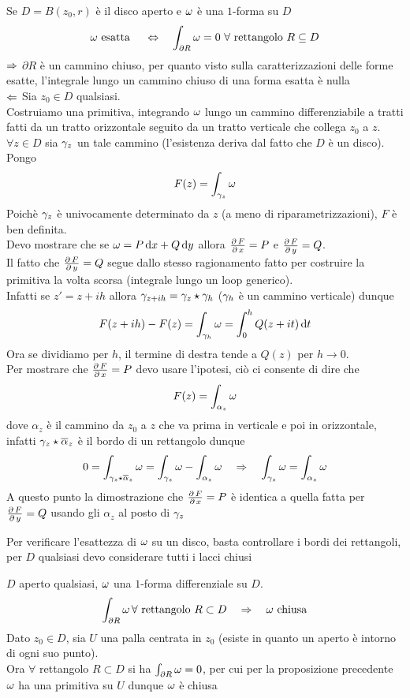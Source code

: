 \begin{prop}Se $D=B(z_0,r)$ \`e il disco aperto e $\omega$ \`e una $1$-forma su $D$
$$\omega \text{ esatta } \quad \Leftrightarrow \quad  \int_{\partial R} \omega = 0 \,\, \forall \text{ rettangolo } R \subseteq D $$
\proof $\Rightarrow$ $\partial R $ \`e un cammino chiuso, per quanto visto sulla caratterizzazioni delle forme esatte, l'integrale lungo un cammino chiuso di una forma esatta \`e nulla\\
$\Leftarrow$ Sia $z_0\in D$ qualsiasi.\\
 Costruiamo una primitiva, integrando $\omega$ lungo un cammino differenziabile a tratti fatti da un tratto orizzontale seguito da un tratto verticale che collega $z_0$ a $z$.\\
$\forall z\in D$ sia $\gamma_z$ un tale cammino (l'esistenza deriva dal fatto che $D$ \`e un disco). Pongo 
$$F(z) =\int_{\gamma_z} \omega$$
Poich\`e $\gamma_z$ \`e univocamente determinato da $z$  (a meno di riparametrizzazioni), $F$ \`e ben definita.\\
Devo mostrare che se $\omega=P\, \mathrm{d} x + Q\, \mathrm{d} y $ allora $\frac{\partial \, F}{\partial\, x} =  P$ e $\frac{\partial \, F}{\partial\, y}=Q$.\\
Il fatto che $\frac{\partial \, F}{\partial\, y} = Q$ segue dallo stesso ragionamento fatto per costruire la primitiva la volta scorsa (integrale lungo un loop generico).\\
Infatti se $z'=z+ih$ allora $\gamma_{z+ih}= \gamma_z\star \gamma_h$ ($\gamma_h$ \`e un cammino verticale) dunque
$$F(z+ih)-F(z)=\int_{\gamma_h} \omega = \int_0^h Q(z+it) \, \mathrm{d}t$$
Ora se dividiamo per $h$, il termine di destra tende a $Q(z)$ per $h\to 0$.\\
Per mostrare che $\frac{\partial \, F}{\partial\, x}=P$ devo usare l'ipotesi, ci\`o ci consente di dire che 
$$F(z) = \int_{\alpha_z} \omega$$ 
dove $\alpha_z$ \`e il cammino da $z_0$ a $z$ che va prima in verticale e poi in orizzontale, infatti  $\gamma_z\star \overline{\alpha}_z$ \`e il bordo di un rettangolo dunque 
$$0=\int_{\gamma_z\star \overline{\alpha}_z} \omega = \int_{\gamma_z} \omega - \int_{\alpha_z} \omega \quad \Rightarrow \quad \int_{\gamma_z} \omega = \int_{\alpha_z}\omega$$ 
A questo punto la dimostrazione che $\frac{\partial \, F}{\partial\, x} = P$ \`e identica a quella fatta per $\frac{\partial \, F}{\partial\, y} = Q$ usando gli $\alpha_z$ al posto di $\gamma_z$\\
\endproof
\begin{oss}Per verificare l'esattezza di $\omega$ su un disco, basta controllare i bordi dei rettangoli, per $D$ qualsiasi devo considerare tutti i lacci chiusi
\end{oss}
\end{prop}
\begin{cor}$D$ aperto qualsiasi, $\omega$ una $1$-forma differenziale su $D$.
$$ \int_{\partial R } \omega \, \forall \text{ rettangolo } R \subset D \quad \Rightarrow \quad \omega \text{ chiusa}$$
\proof Dato $z_0\in D$, sia $U$ una palla centrata in $z_0$ (esiste in quanto un aperto \`e intorno di ogni suo punto).\\
Ora $\forall$ rettangolo $R\subset D$ si ha $\int_{\partial R} \omega=0$, per cui per la proposizione precedente $\omega$ ha una primitiva su $U$ dunque $\omega$ \`e chiusa
\end{cor}
\newpage

